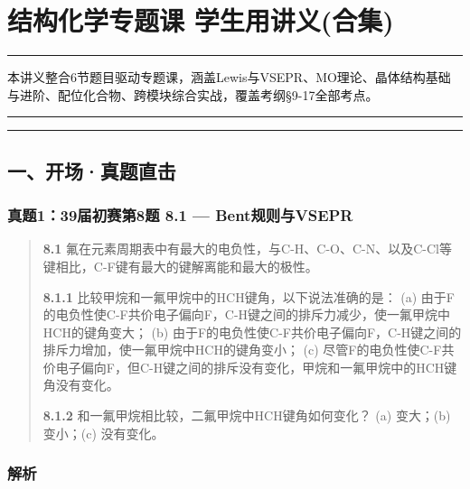 \section{结构化学专题课 学生用讲义(合集)}\label{ux7ed3ux6784ux5316ux5b66ux4e13ux9898ux8bfe-ux5b66ux751fux7528ux8bb2ux4e49ux5408ux96c6}

\begin{center}\rule{0.5\linewidth}{0.5pt}\end{center}

本讲义整合6节题目驱动专题课，涵盖Lewis与VSEPR、MO理论、晶体结构基础与进阶、配位化合物、跨模块综合实战，覆盖考纲§9-17全部考点。

\begin{center}\rule{0.5\linewidth}{0.5pt}\end{center}

\begin{center}\rule{0.5\linewidth}{0.5pt}\end{center}

\subsection{一、开场·真题直击}\label{ux4e00ux5f00ux573aux771fux9898ux76f4ux51fb}

\subsubsection{真题1：39届初赛第8题 8.1 --- Bent规则与VSEPR}\label{ux771fux9898139ux5c4aux521dux8d5bux7b2c8ux9898-8.1-bentux89c4ux5219ux4e0evsepr}

\begin{quote}
\textbf{8.1} 氟在元素周期表中有最大的电负性，与C-H、C-O、C-N、以及C-Cl等键相比，C-F键有最大的键解离能和最大的极性。

\textbf{8.1.1} 比较甲烷和一氟甲烷中的HCH键角，以下说法准确的是：
(a) 由于F的电负性使C-F共价电子偏向F，C-H键之间的排斥力减少，使一氟甲烷中HCH的键角变大；
(b) 由于F的电负性使C-F共价电子偏向F，C-H键之间的排斥力增加，使一氟甲烷中HCH的键角变小；
(c) 尽管F的电负性使C-F共价电子偏向F，但C-H键之间的排斥没有变化，甲烷和一氟甲烷中的HCH键角没有变化。

\textbf{8.1.2} 和一氟甲烷相比较，二氟甲烷中HCH键角如何变化？
(a) 变大；(b) 变小；(c) 没有变化。
\end{quote}

\subsubsection{解析}\label{ux89e3ux6790}

